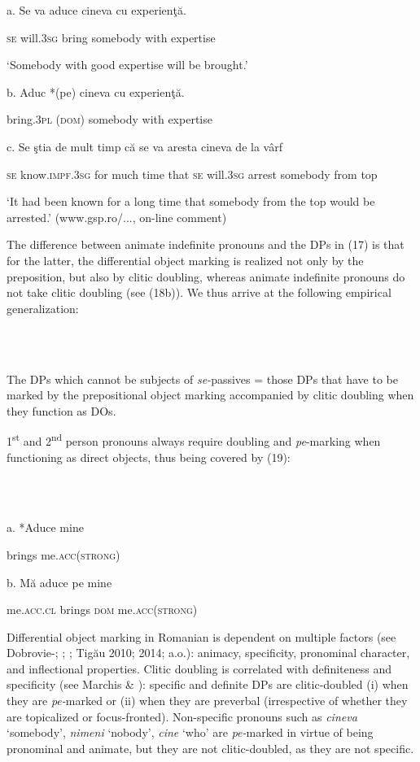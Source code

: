 \documentclass[output=paper]{langsci/langscibook}
\begin{document}
          a.   Se va           aduce  cineva       cu    experienţă.

      \textsc{se} will.3\textsc{sg}  bring   somebody with expertise

      ‘Somebody with good expertise will be brought.’

b.   Aduc      *(pe)   cineva        cu    experienţă.

      bring.3\textsc{pl} (\textsc{dom}) somebody with expertise

c.   Se ştia                  de  mult  timp  că   se  va          aresta cineva       de la vârf

     \textsc{se} know.\textsc{impf.3sg} for much time that \textsc{se} will.3\textsc{sg} arrest somebody from top

‘It had been known for a long time that somebody from the top would be arrested.’ (www.gsp.ro/..., on-line comment)

The difference between animate indefinite pronouns and the DPs in (17) is that for the latter, the differential object marking is realized not only by the preposition, but also by clitic doubling, whereas animate indefinite pronouns do not take clitic doubling (see (18b)). We thus arrive at the following empirical generalization:

\ea%
    \label{ex:key:19}
    \gll\\
        \\
    \glt
    \z

          The DPs which cannot be subjects of \textit{se-}passives = those DPs that have to be marked by the prepositional object marking accompanied by clitic doubling when they function as DOs. 

1\textsuperscript{st} and 2\textsuperscript{nd} person pronouns always require doubling and \textit{pe}{}-marking when functioning as direct objects, thus being covered by (19):

\ea%
    \label{ex:key:20}
    \gll\\
        \\
    \glt
    \z

          a.   *Aduce mine

       brings   me.\textsc{acc(strong)}

b.   Mă              aduce pe    mine

      me.\textsc{acc.cl} brings \textsc{dom} me.\textsc{acc(strong)}

Differential object marking in Romanian is dependent on multiple factors (see Dobrovie-\citealt{Sorin1994}; \citealt{Cornilescu2000}; \citealt{Mardale2008}; Tigău 2010; 2014; a.o.): animacy, specificity, pronominal character, and inflectional properties. Clitic doubling is correlated with definiteness and specificity (see Marchis \& \citealt{Alexiadou2013}): specific and definite DPs are clitic-doubled (i) when they are \textit{pe-}marked or (ii) when they are preverbal (irrespective of whether they are topicalized or focus-fronted). Non-specific pronouns such as \textit{cineva} ‘somebody’, \textit{nimeni} ‘nobody’, \textit{cine} ‘who’ are \textit{pe-}marked in virtue of being pronominal and animate, but they are not clitic-doubled, as they are not specific.
\end{document}
